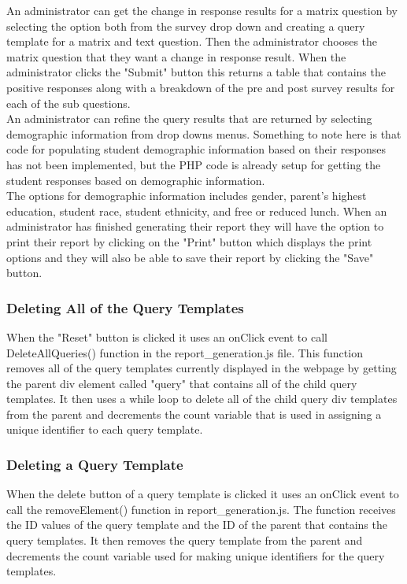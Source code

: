 \documentclass[../final.tex]{subfiles}
\begin{document}
	  An administrator can get the change in response results for a matrix question by selecting the option both from the survey drop down and creating a query template for a matrix and text question. Then the administrator chooses the matrix question that they want a change in response result. When the administrator clicks the "Submit" button this returns a table that contains the positive responses along with a breakdown of the pre and post survey results for each of the sub questions.\\
	  An administrator can refine the query results that are returned by selecting demographic information from drop downs menus. Something to note here is that code for populating student demographic information based on their responses has not been implemented, but the PHP code is already setup for getting the student responses based on demographic information.\\
	   The options for demographic information includes gender, parent's highest education, student race, student ethnicity, and free or reduced lunch. When an administrator has finished generating their report they will have the option to print their report by clicking on the "Print" button which displays the print options and they will also be able to save their report by clicking the "Save" button.
	\subsubsection{Deleting All of the Query Templates}
	When the "Reset" button is clicked it uses an onClick event to call DeleteAllQueries() function in the report\_generation.js file. This function removes all of the query templates currently displayed in the webpage by getting the parent div element called "query" that contains all of the child query templates. It then uses a while loop to delete all of the child query div templates from the parent and decrements the count variable that is used in assigning a unique identifier to each query template.
	\subsubsection{Deleting a Query Template}
	When the delete button of a query template is clicked it uses an onClick event to call the removeElement() function in report\_generation.js. The function receives the ID values of the query template and the ID of the parent that contains the query templates. It then removes the query template from the parent and decrements the count variable used for making unique identifiers for the query templates.  
\end{document}
